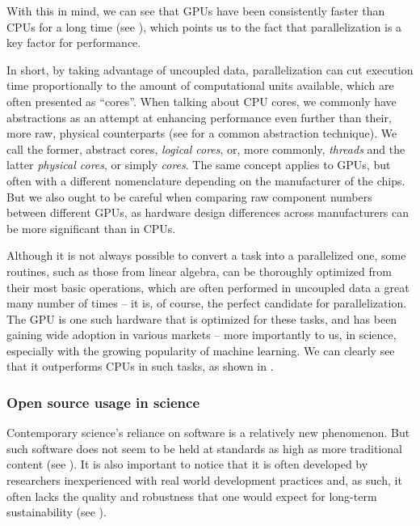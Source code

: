 \documentclass[11pt, conference, onecolumn, final]{IEEEtran}
\begin{document}
With this in mind, we can see that GPUs have been consistently faster than CPUs
for a long time (see \cite{sun2019summarizing}), which points us to the fact
that parallelization is a key factor for performance.

In short, by taking advantage of uncoupled data, parallelization can cut
execution time proportionally to the amount of computational units available,
which are often presented as ``cores''.
When talking about CPU cores, we commonly have abstractions as an attempt at
enhancing performance even further than their, more raw, physical counterparts
(see \cite{magro2002hyper} for a common abstraction technique).
We call the former, abstract cores, \textit{logical cores}, or, more commonly,
\textit{threads} and the latter \textit{physical cores}, or simply
\textit{cores}.
The same concept applies to GPUs, but often with a different nomenclature
depending on the manufacturer of the chips.
But we also ought to be careful when comparing raw component numbers between
different GPUs, as hardware design differences across manufacturers can be
more significant than in CPUs.

Although it is not always possible to convert a  task into a
parallelized one, some routines, such as those from linear algebra, can be
thoroughly optimized from their most basic operations, which are often
performed in uncoupled data a great many number of times -- it is, of course,
the perfect candidate for parallelization.
The GPU is one such hardware that is optimized for these tasks, and has been
gaining wide adoption in various markets -- more importantly to us, in science,
especially with the growing popularity of machine learning.
We can clearly see that it outperforms CPUs in such tasks, as shown in
\cite{buber2018performance}.

\subsubsection{Open source usage in science} \label{sec:motivation:floss-in-science}

Contemporary science's reliance on software is a relatively new phenomenon.
But such software does not seem to be held at standards as high as more
traditional content (see \cite{sufi2014software}).
It is also important to notice that it is often developed by researchers
inexperienced with real world development practices and, as such, it often
lacks the quality and robustness that one would expect for long-term
sustainability (see \cite{carver2022survey}).
\end{document}
